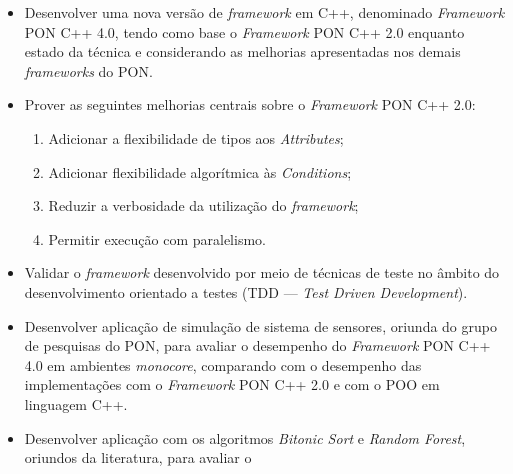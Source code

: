 \newcommand{\SubItem}[1]{
    {\setlength\itemindent{15pt} \item[-] #1}
}
\begin{itemize}
  \item Desenvolver uma nova versão de \textit{framework} em C++, denominado
        \textit{Framework} PON C++ 4.0, tendo como base o \textit{Framework} PON
        C++ 2.0 enquanto estado da técnica e considerando as melhorias
        apresentadas nos demais \textit{frameworks} do PON.
  \item Prover as seguintes melhorias centrais sobre o \textit{Framework} PON C++ 2.0:
  \begin{enumerate}[label=(\alph*)]
  \item Adicionar a flexibilidade de tipos aos \textit{Attributes};
  \item Adicionar flexibilidade algorítmica às \textit{Conditions};
  \item Reduzir a verbosidade da utilização do \textit{framework};
  \item Permitir execução com paralelismo.
  \end{enumerate}
  \item Validar o \textit{framework} desenvolvido por meio de técnicas de teste
        no âmbito do desenvolvimento orientado a testes (TDD — \textit{Test
        Driven Development}).
  \item Desenvolver aplicação de simulação de sistema de sensores, oriunda do
        grupo de pesquisas do PON, para avaliar o desempenho do
        \textit{Framework} PON C++ 4.0 em ambientes \textit{monocore},
        comparando com o desempenho das implementações com o \textit{Framework}
        PON C++ 2.0 e com o POO em linguagem C++.
  \item Desenvolver aplicação com os algoritmos \textit{Bitonic Sort} e
        \textit{Random Forest}, oriundos da literatura, para avaliar o

\end{itemize}
